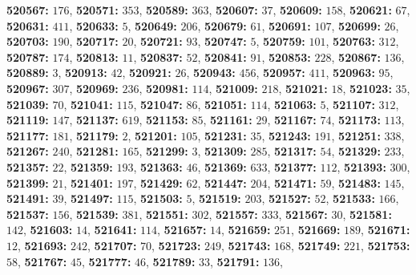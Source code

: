 \textsf{\bfseries 520567:} $176$, \textsf{\bfseries 520571:} $353$, \textsf{\bfseries 520589:} $363$, \textsf{\bfseries 520607:} $37$, \textsf{\bfseries 520609:} $158$, \textsf{\bfseries 520621:} $67$, \textsf{\bfseries 520631:} $411$, \textsf{\bfseries 520633:} $5$, \textsf{\bfseries 520649:} $206$, \textsf{\bfseries 520679:} $61$, \textsf{\bfseries 520691:} $107$, \textsf{\bfseries 520699:} $26$, \textsf{\bfseries 520703:} $190$, \textsf{\bfseries 520717:} $20$, \textsf{\bfseries 520721:} $93$, \textsf{\bfseries 520747:} $5$, \textsf{\bfseries 520759:} $101$, \textsf{\bfseries 520763:} $312$, \textsf{\bfseries 520787:} $174$, \textsf{\bfseries 520813:} $11$, \textsf{\bfseries 520837:} $52$, \textsf{\bfseries 520841:} $91$, \textsf{\bfseries 520853:} $228$, \textsf{\bfseries 520867:} $136$, \textsf{\bfseries 520889:} $3$, \textsf{\bfseries 520913:} $42$, \textsf{\bfseries 520921:} $26$, \textsf{\bfseries 520943:} $456$, \textsf{\bfseries 520957:} $411$, \textsf{\bfseries 520963:} $95$, \textsf{\bfseries 520967:} $307$, \textsf{\bfseries 520969:} $236$, \textsf{\bfseries 520981:} $114$, \textsf{\bfseries 521009:} $218$, \textsf{\bfseries 521021:} $18$, \textsf{\bfseries 521023:} $35$, \textsf{\bfseries 521039:} $70$, \textsf{\bfseries 521041:} $115$, \textsf{\bfseries 521047:} $86$, \textsf{\bfseries 521051:} $114$, \textsf{\bfseries 521063:} $5$, \textsf{\bfseries 521107:} $312$, \textsf{\bfseries 521119:} $147$, \textsf{\bfseries 521137:} $619$, \textsf{\bfseries 521153:} $85$, \textsf{\bfseries 521161:} $29$, \textsf{\bfseries 521167:} $74$, \textsf{\bfseries 521173:} $113$, \textsf{\bfseries 521177:} $181$, \textsf{\bfseries 521179:} $2$, \textsf{\bfseries 521201:} $105$, \textsf{\bfseries 521231:} $35$, \textsf{\bfseries 521243:} $191$, \textsf{\bfseries 521251:} $338$, \textsf{\bfseries 521267:} $240$, \textsf{\bfseries 521281:} $165$, \textsf{\bfseries 521299:} $3$, \textsf{\bfseries 521309:} $285$, \textsf{\bfseries 521317:} $54$, \textsf{\bfseries 521329:} $233$, \textsf{\bfseries 521357:} $22$, \textsf{\bfseries 521359:} $193$, \textsf{\bfseries 521363:} $46$, \textsf{\bfseries 521369:} $633$, \textsf{\bfseries 521377:} $112$, \textsf{\bfseries 521393:} $300$, \textsf{\bfseries 521399:} $21$, \textsf{\bfseries 521401:} $197$, \textsf{\bfseries 521429:} $62$, \textsf{\bfseries 521447:} $204$, \textsf{\bfseries 521471:} $59$, \textsf{\bfseries 521483:} $145$, \textsf{\bfseries 521491:} $39$, \textsf{\bfseries 521497:} $115$, \textsf{\bfseries 521503:} $5$, \textsf{\bfseries 521519:} $203$, \textsf{\bfseries 521527:} $52$, \textsf{\bfseries 521533:} $166$, \textsf{\bfseries 521537:} $156$, \textsf{\bfseries 521539:} $381$, \textsf{\bfseries 521551:} $302$, \textsf{\bfseries 521557:} $333$, \textsf{\bfseries 521567:} $30$, \textsf{\bfseries 521581:} $142$, \textsf{\bfseries 521603:} $14$, \textsf{\bfseries 521641:} $114$, \textsf{\bfseries 521657:} $14$, \textsf{\bfseries 521659:} $251$, \textsf{\bfseries 521669:} $189$, \textsf{\bfseries 521671:} $12$, \textsf{\bfseries 521693:} $242$, \textsf{\bfseries 521707:} $70$, \textsf{\bfseries 521723:} $249$, \textsf{\bfseries 521743:} $168$, \textsf{\bfseries 521749:} $221$, \textsf{\bfseries 521753:} $58$, \textsf{\bfseries 521767:} $45$, \textsf{\bfseries 521777:} $46$, \textsf{\bfseries 521789:} $33$, \textsf{\bfseries 521791:} $136$, 
